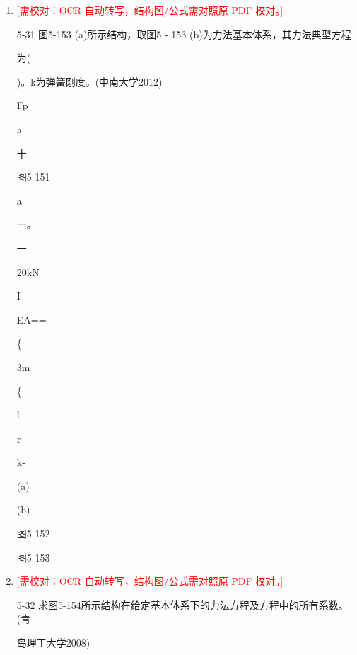 \documentclass[UTF8,12pt,a4paper,openany]{ctexbook}
\newcommand{\TODO}[1]{\textcolor{red}{[需校对：#1]}}
\begin{document}
\begin{enumerate}[label=\textbf{\arabic*.},leftmargin=2em]
par 6m\par 6m\par l\par 1\par 1\par ．，\par 图5-149\par 图5-150\par 4. 弹性支承超静定结构的计算
\item \TODO{OCR 自动转写，结构图/公式需对照原 PDF 校对。}\par 5-31 图5-153 (a)所示结构，取图5 - 153 (b)为力法基本体系，其力法典型方程\par 为(\par )。k为弹簧刚度。(中南大学2012)\par Fp\par a\par 十\par 图5-151\par a\par 一。\par 一\par 20kN\par I\par EA==\par \{\par 3m\par \{\par l\par r\par k-\par (a)\par (b)\par 图5-152\par 图5-153
\item \TODO{OCR 自动转写，结构图/公式需对照原 PDF 校对。}\par 5-32 求图5-154所示结构在给定基本体系下的力法方程及方程中的所有系数。(青\par 岛理工大学2008)

\end{enumerate}
\end{document}
